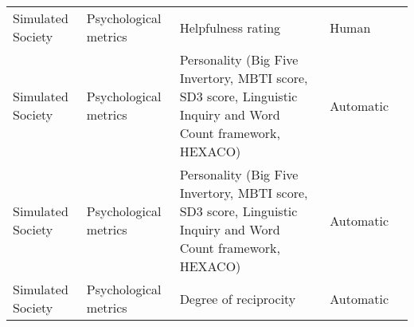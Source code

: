 \begin{small}
\begin{center}
\begin{longtable}{@{}p{}p{}p{}p{}p{}@{}}
Simulated Society        & Psychological metrics & Helpfulness rating                                                                                                                                                                                          & Human     & \cite{10.1145/3613904.3642545}                                                                                                                                                                                                                                                                                                                                                                          \\
Simulated Society        & Psychological metrics & Personality (Big Five Invertory, MBTI score, SD3 score, Linguistic Inquiry and Word Count framework, HEXACO)                                                                                                & Automatic & \cite{frisch2024llmagentsinteractionmeasuring}                                                                                                                                                                                                                                                                                                                                                                                      \\
Simulated Society        & Psychological metrics & Personality (Big Five Invertory, MBTI score, SD3 score, Linguistic Inquiry and Word Count framework, HEXACO)                                                                                                & Automatic & \cite{Li2024EvolvingAI}                                                                                                                                                                                                                                                                                                                                                                                                    \\
Simulated Society        & Psychological metrics & Degree of reciprocity                                                                                                                                                                                       & Automatic & \cite{leng2024llmagentsexhibitsocial}                                                                                                                                                                                                                                                                                                                                                                                              \\

\end{longtable}
\end{center}
\end{small}

